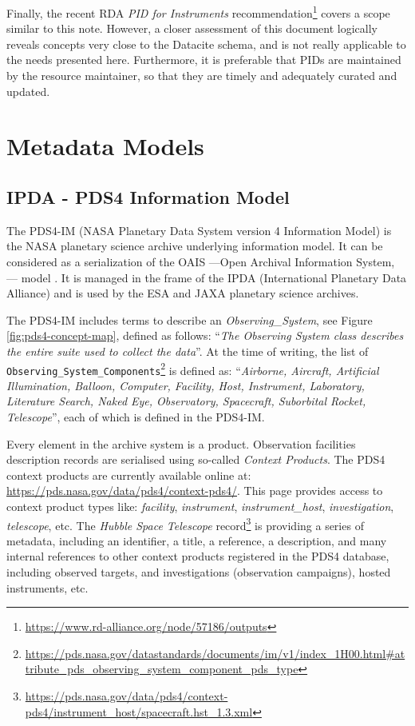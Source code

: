 \documentclass[11pt,a4paper]{ivoa}
\begin{document}
Finally, the recent RDA \emph{PID for Instruments} 
recommendation\footnote{\url{https://www.rd-alliance.org/node/57186/outputs}} 
covers a scope similar to this note. However, a closer 
assessment of this document logically reveals concepts very 
close to the Datacite schema, and is not really applicable to 
the needs presented here. Furthermore, it is preferable that 
PIDs are maintained by the resource maintainer, so that they 
are timely and adequately curated and updated. 

\appendix
\section{Metadata Models}
\label{appendix:models}

\subsection{IPDA - PDS4 Information Model}
The PDS4-IM (NASA Planetary Data System version 4 Information Model) 
is the NASA planetary science archive underlying information
model. It can be considered as a serialization of the OAIS ---Open 
Archival Information System, \citep{iso:oais}--- model \citep{Hughes:2017bt}.  
It is managed in the frame of the IPDA (International Planetary 
Data Alliance) and is used by the ESA and JAXA planetary science 
archives. 

The PDS4-IM includes terms to describe an \emph{Observing\_System}, see 
Figure \ref{fig:pds4-concept-map}, defined as follows:
``\emph{The Observing System class describes the entire suite used to 
collect the data}''. At the time of writing, the list of 
\texttt{Observing\_System\_Components}\footnote{
\url{https://pds.nasa.gov/datastandards/documents/im/v1/index_1H00.html\#attribute_pds_observing_system_component_pds_type}}
is defined as: ``\emph{Airborne, Aircraft, Artificial Illumination, 
Balloon, Computer, Facility, Host, Instrument, Laboratory, Literature 
Search, Naked Eye, Observatory, Spacecraft, Suborbital Rocket, 
Telescope}'', each of which is defined in the PDS4-IM. 

Every element in the archive system is a product. Observation 
facilities description records are serialised using so-called 
\emph{Context Products}. The PDS4 context
products are currently available online at: 
\url{https://pds.nasa.gov/data/pds4/context-pds4/}. This 
page provides access to context product types like: \emph{facility}, 
\emph{instrument}, \emph{instrument\_host}, \emph{investigation}, 
\emph{telescope}, etc. The \emph{Hubble Space Telescope} 
record\footnote{\protect\url{https://pds.nasa.gov/data/pds4/context-pds4/instrument_host/spacecraft.hst_1.3.xml}} 
is providing a series of metadata, including an identifier, a title, 
a reference, a description, and many internal references to other 
context products registered in the PDS4 database, including 
observed targets, and investigations (observation campaigns), hosted 
instruments, etc.
\end{document}
